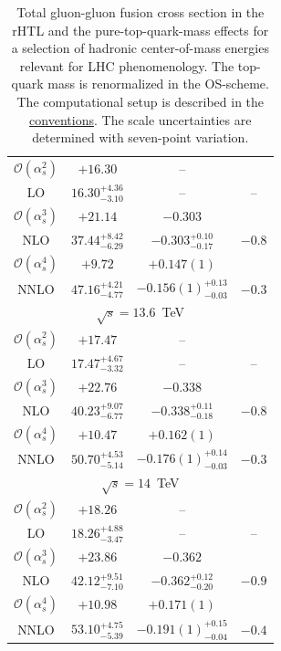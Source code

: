 \begin{table}[t]
\begin{tabular}{cccc}
\hline
$\mathcal{O}(\alpha_s^2)$ & $+16.30$ & -- &   \\
LO & $16.30^{+4.36}_{-3.10}$ & -- & --  \\
\hline
$\mathcal{O}(\alpha_s^3)$ & $+21.14$ & $-0.303$ &  \\
NLO & $37.44^{+8.42}_{-6.29}$ & $-0.303^{+0.10}_{-0.17}$ & $-0.8$  \\
\hline
$\mathcal{O}(\alpha_s^4)$ & $+9.72$ & $+0.147(1)$ &   \\
NNLO & $47.16^{+4.21}_{-4.77}$ & $-0.156(1)^{+0.13}_{-0.03}$ & $-0.3$  \\
\hline
\hline
\multicolumn{4}{c}{$\sqrt{s}=13.6$~TeV}\\
\hline
$\mathcal{O}(\alpha_s^2)$ & $+17.47$ & -- &   \\
LO & $17.47^{+4.67}_{-3.32}$ & -- & --  \\
\hline
$\mathcal{O}(\alpha_s^3)$ & $+22.76$ & $-0.338$ &   \\
NLO & $40.23^{+9.07}_{-6.77}$ & $-0.338^{+0.11}_{-0.18}$ & $-0.8$  \\
\hline
$\mathcal{O}(\alpha_s^4)$ & $+10.47$ & $+0.162(1)$ &  \\
NNLO & $50.70^{+4.53}_{-5.14}$ & $-0.176(1)^{+0.14}_{-0.03}$ & $-0.3$  \\
\hline
\hline
\multicolumn{4}{c}{$\sqrt{s}=14$~TeV}\\
\hline
$\mathcal{O}(\alpha_s^2)$ & $+18.26$ & -- &   \\
LO & $18.26^{+4.88}_{-3.47}$ & -- & --  \\
\hline
$\mathcal{O}(\alpha_s^3)$ & $+23.86$ & $-0.362$ &   \\
NLO & $42.12^{+9.51}_{-7.10}$ & $-0.362^{+0.12}_{-0.20}$ & $-0.9$  \\
\hline
$\mathcal{O}(\alpha_s^4)$ & $+10.98$ & $+0.171(1)$ &   \\
NNLO & $53.10^{+4.75}_{-5.39}$ & $-0.191(1)^{+0.15}_{-0.04}$ & $-0.4$  \\
\hline
\end{tabular}
\caption{Total gluon-gluon fusion cross section in the \acs{rHTL} and the pure-top-quark-mass effects for a selection of hadronic center-of-mass energies relevant for \acs{LHC} phenomenology. The top-quark mass is renormalized in the \acs{OS}-scheme. The computational setup is described in the \hyperref[chap:notation_and_conventions]{conventions}. The scale uncertainties are determined with seven-point variation.}
\label{tab:6:t-HEFT}
\end{table}
